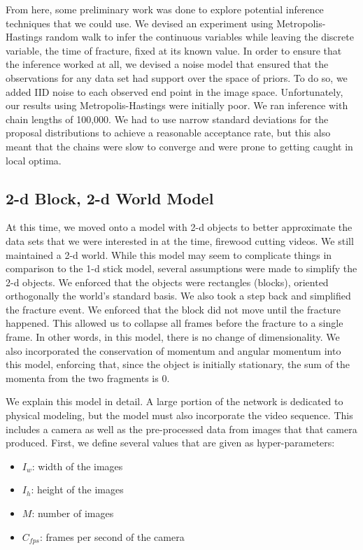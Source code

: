 \documentclass[10pt,twocolumn,letterpaper]{article}
\begin{document}
From here, some preliminary work was done to explore potential 
inference techniques that we could use. We devised an experiment using 
Metropolis-Hastings random walk to infer the continuous variables while leaving the discrete 
variable, the time of fracture, fixed at its known value. In order to ensure 
that the inference worked at all, we devised a noise model that ensured that 
the observations for any data set had support over the space of priors. To do 
so, we added IID noise to each observed end point in the image space. 
Unfortunately, our results using Metropolis-Hastings were initially poor. We ran inference with 
chain lengths of 100,000. We had to use narrow standard deviations for the 
proposal distributions to achieve a reasonable acceptance rate, but this also 
meant that the chains were slow to converge and were prone to getting caught 
in local optima.

\subsection{2-d Block, 2-d World Model}

At this time, we moved onto a model with 2-d objects to better approximate the 
data sets that we were interested in at the time, firewood cutting videos. We 
still maintained a 2-d world. While this model may seem to 
complicate things in comparison to the 1-d stick model, several assumptions were made to 
simplify the 2-d objects. We enforced  
that the objects were rectangles (blocks), oriented orthogonally the world's standard 
basis. We also took a step back and simplified the fracture event. We  
enforced that the block did not move until the fracture happened. This 
allowed us to collapse all frames before the fracture to a single frame. In 
other words, in this model, there is no change of dimensionality. We also 
incorporated the conservation of momentum and angular momentum into this model, 
enforcing that, since the object is initially stationary, the sum of the momenta 
from the two fragments is 0.

We explain this model in detail. A large portion of the network is dedicated to physical modeling, but the model 
must also incorporate the video sequence. This includes a camera as well as the 
pre-processed data from images that that camera produced. First, we define 
several values that are given as hyper-parameters:

\begin{itemize}
    \item $I_w$: width of the images
    \item $I_h$: height of the images
    \item $M$: number of images
    \item $C_{fps}$: frames per second of the camera
\end{itemize}
\end{document}
